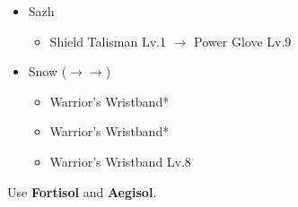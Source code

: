 \begin{menu}
\begin{itemize}
\begin{itemize}
\begin{itemize}
				\end{itemize}
		\end{itemize}
		\equip
		\begin{itemize}
			\item Sazh
				\begin{itemize}
					\item Shield Talisman Lv.1 $\rightarrow$ Power Glove Lv.9
				\end{itemize}
			\item Snow ($\rightarrow\rightarrow$)
				\begin{itemize}
					\item Warrior's Wristband*
					\item Warrior's Wristband*
					\item Warrior's Wristband Lv.8
				\end{itemize}
		\end{itemize}
	\end{itemize}
\end{menu}

\renewcommand{\third}{[3] Relentless Assault (\com/\rav/\rav)}
\renewcommand{\fourth}{[4] Bully (\syn/\sab/\com)}
\renewcommand{\fifth}{[5] Thaumaturgy (\rav/\med/\rav)}

Use \textbf{Fortisol} and \textbf{Aegisol}.

